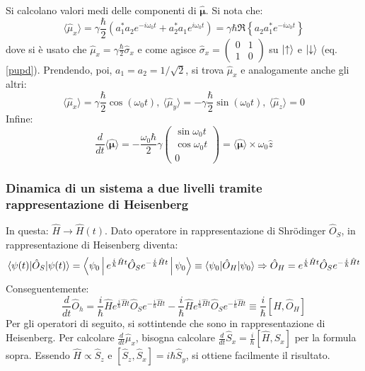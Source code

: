 \documentclass[10pt, a4paper]{scrartcl} %
\numberwithin{equation}{subsection}
\theoremstyle{style2}
\theoremstyle{style1}
\begin{document}
Si calcolano valori medi delle componenti di $\hat{\pmb{\mu }} $. Si nota che:
\begin{equation}
		\langle \hat{\mu }_x \rangle = \gamma \frac{\hbar }{2} \left(a_1^* a_2 e^{-i\omega_0 t} + a_2^* a_1 e^{ i \omega_0 t} \right)= \gamma \hbar  \Re \left\{ a_2a_1^* e^{-i\omega_0 t}  \right\} 
\end{equation}
dove si \`e usato che $\hat{\mu } _x = \gamma \frac{\hbar }{2} \hat{\sigma }_x$ e come agisce $\hat{\sigma } _x = \begin{pmatrix} 0& 1 \\ 1 & 0  \end{pmatrix} $ su $\ket{\uparrow} $ e $\ket{\downarrow} $ (eq. \ref{pupd}). Prendendo, poi, $a_1=a_2 = 1 / \sqrt{2} $, si trova $\hat{\mu } _x$ e analogamente anche gli altri:
\begin{equation}
	\langle \hat{\mu } _x \rangle = \gamma \frac{\hbar}{2} \cos(\omega_0 t) , \ \langle \hat{\mu } _y \rangle = - \gamma \frac{\hbar }{2} \sin(\omega_0t) , \ \langle \hat{\mu } _z \rangle = 0
\end{equation}
Infine:
\begin{equation}
		\frac{d }{d t} \langle \hat{\pmb{\mu } } \rangle = - \frac{\omega_0 \hbar }{2} \gamma \begin{pmatrix} \sin \omega_0 t \\ \cos \omega_0 t \\ 0 \end{pmatrix} = \langle \hat{\pmb{\mu }  }\rangle \times \omega _0 \hat{z}
\end{equation}

\subsubsection{Dinamica di un sistema a due livelli tramite rappresentazione di Heisenberg}

In questa: $\hat{H} \to \hat{H} (t)$. Dato operatore in rappresentazione di Shr\"odinger $\hat{O}_S$, in rappresentazione di Heisenberg diventa:
\[
\braket{\psi (t)| \hat{O}_S|\psi (t)} = \Braket{\psi _0| e^{ \frac{i}{\hbar } \hat{H}t} \hat{O}_S e^{-\frac{i}{\hbar }\hat{H}t} | \psi _0}  \equiv \braket{\psi_0|\hat{O}_H|\psi _0} \Rightarrow \hat{O}_H = e^{ \frac{i}{\hbar } \hat{H}t} \hat{O}_S e^{-\frac{i}{\hbar }\hat{H}t} 
\] 
Conseguentemente:
\begin{equation}
	\frac{d }{d t}  \hat{O}_h = \frac{i}{\hbar }\hat{H} e^{ \frac{i}{\hbar } \hat{H}t}  \hat{O}_S  e^{- \frac{i}{\hbar }\hat{H}t}  - \frac{i}{\hbar } \hat{H} e^{ \frac{i}{\hbar }\hat{H}t}  \hat{O}_S e^{ - \frac{i}{\hbar }\hat{H}t} \equiv \frac{i}{\hbar } [\hat{H},\hat{O}_H] 	 
\end{equation}
Per gli operatori di seguito, si sottintende che sono in rappresentazione di Heisenberg. Per calcolare $\frac{d }{d t} \hat{\mu }_x$, bisogna calcolare $\frac{d }{d t} \hat{S}_x = \frac{i}{\hbar }[\hat{H},\hat{S}_x]$ per la formula sopra. 
Essendo $\hat{H} \propto \hat{S }_z$ e $[\hat{S}_z, \hat{S}_x] = i\hbar  \hat{S}_y$, si ottiene facilmente il risultato.
\end{document}
